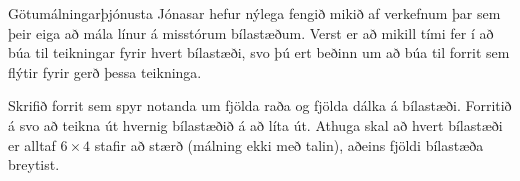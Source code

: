 \begin{problem}
	Götumálningarþjónusta Jónasar hefur nýlega fengið mikið af verkefnum þar sem þeir eiga að mála línur á misstórum bílastæðum.
	Verst er að mikill tími fer í að búa til teikningar fyrir hvert bílastæði, svo þú ert beðinn um að búa til forrit sem flýtir fyrir gerð þessa teikninga.

	Skrifið forrit sem spyr notanda um fjölda raða og fjölda dálka á bílastæði. Forritið á svo að teikna út hvernig bílastæðið á að líta út.
	Athuga skal að hvert bílastæði er alltaf $6 \times 4$ stafir að stærð (málning ekki með talin), aðeins fjöldi bílastæða breytist.

\begin{example}
%
\end{example}
\begin{example}
%
\end{example}
\end{problem}